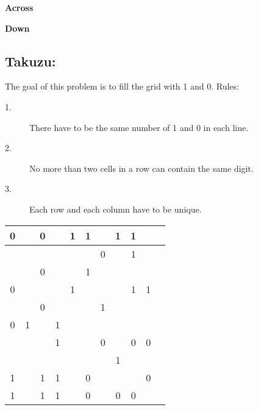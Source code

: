 \documentclass{article}
\begin{document}
\begin{PuzzleClues}{\textbf{Across}} %
\end{PuzzleClues} %

\begin{PuzzleClues}{\textbf{Down}}
\end{PuzzleClues}

\subsection*{Takuzu:}
The goal of this problem is to fill the grid with 1 and 0. 
Rules:
\begin{description}
\item[1.] There have to be the same number of 1 and 0 in each line.
\item[2.] No more than two cells in a row can contain the same digit.
\item[3.] Each row and each column have to be unique.
\end{description}

\begin{table}[ht]
\centering
\begin{tabular}{|c|c|c|c|c|c|c|c|c|c|c|}
\hline 0 &   & 0 &   & 1 & 1 &   & 1 & 1 &   \\ 
\hline   &   &   &   &   &   & 0 &   & 1 &   \\ 
\hline   &   & 0 &   &   & 1 &   &   &   &   \\ 
\hline 0 &   &   &   & 1 &   &   &   & 1 & 1 \\ 
\hline   &   & 0 &   &   &   & 1 &   &   &   \\ 
\hline 0 & 1 &   & 1 &   &   &   &   &   &   \\ 
\hline   &   &   & 1 &   &   & 0 &   & 0 & 0 \\ 
\hline   &   &   &   &   &   &   & 1 &   &   \\ 
\hline 1 &   & 1 & 1 &   & 0 &   &   &   & 0 \\ 
\hline 1 &   & 1 & 1 &   & 0 &   & 0 & 0 &   \\
\hline
\end{tabular}
\end{table} 
\end{document}
